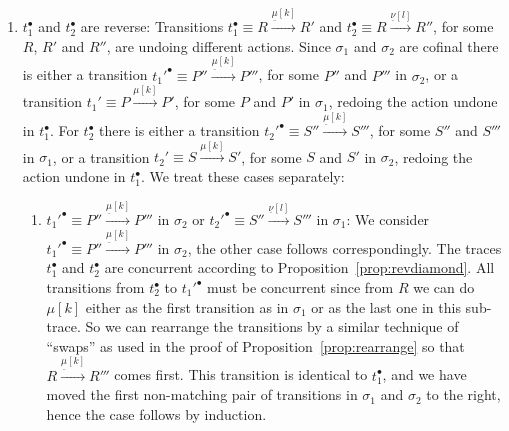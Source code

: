 \begin{pf}
\begin{enumerate}
\item $t_1^\bullet$ and $t_2^\bullet$ are reverse: Transitions $t_1^\bullet \equiv R \xrightarrow{\underline{\mu}[k]} R'$ and $t_2^\bullet \equiv R \xrightarrow{\underline{\nu}[l]} R''$, for some $R$, $R'$ and $R''$, 
are undoing different actions. Since $\sigma_1$ and $\sigma_2$ are cofinal there is either a transition 
$t_1'^\bullet \equiv P'' \xrightarrow{\underline{\mu}[k]} P'''$, for some $P''$ and  $P'''$ in $\sigma_2$, 
or a transition $t_1' \equiv P \xrightarrow{\mu[k]} P'$, for some $P$ and $P'$ in $\sigma_1$, 
redoing the action undone in $t_1^\bullet$. For $t_2^\bullet$ there is either a transition 
$t_2'^\bullet \equiv S'' \xrightarrow{\underline{\mu}[k]} S'''$, for some $S''$ and $S'''$ in $\sigma_1$, 
or a transition $t_2' \equiv S \xrightarrow{\mu[k]} S'$, for some $S$ and $S'$ in $\sigma_2$, 
redoing the action undone in $t_1^\bullet$. We treat these cases separately:

\begin{enumerate}

\item $t_1'^\bullet \equiv P'' \xrightarrow{\underline{\mu}[k]} P'''$ in $\sigma_2$ or $t_2'^\bullet \equiv S'' \xrightarrow{\underline{\nu}[l]} S'''$ in $\sigma_1$: We consider $t_1'^\bullet \equiv P'' \xrightarrow{\underline{\mu}[k]} P'''$ in $\sigma_2$, the other case follows correspondingly. The traces $t_1^\bullet$ and 
$t_2^\bullet$ are concurrent according to Proposition~\ref{prop:revdiamond}. All transitions 
from $t_2^\bullet$ to $t_1'^\bullet$ must be concurrent since from $R$ we can do $\mu[k]$ either as the first transition as in $\sigma_1$ or as the last one in this sub-trace. So we can rearrange the transitions by a similar technique of ``swaps'' as used in the proof of Proposition~\ref{prop:rearrange} so that 
$R \xrightarrow{\underline{\mu}[k]} R'''$ comes first. This transition is identical to $t_1^\bullet$, 
and we have moved the first non-matching pair of transitions in $\sigma_1$ and $\sigma_2$ to the right, hence the case follows by induction.


\end{enumerate}
\end{enumerate}
\end{pf}
